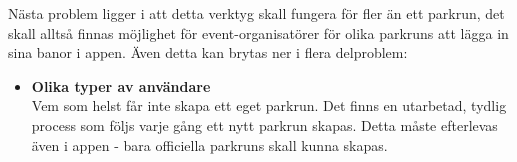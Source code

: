Nästa problem ligger i att detta verktyg skall fungera för fler än ett parkrun, det skall alltså finnas möjlighet för event-organisatörer för olika parkruns att lägga in sina banor i appen. Även detta kan brytas ner i flera delproblem:
\begin{itemize}
    \item \textbf{Olika typer av användare}\\
        Vem som helst får inte skapa ett eget parkrun. Det finns en utarbetad, tydlig process som följs varje gång ett nytt parkrun skapas. Detta måste efterlevas även i appen - bara officiella parkruns skall kunna skapas. 
\end{itemize}


